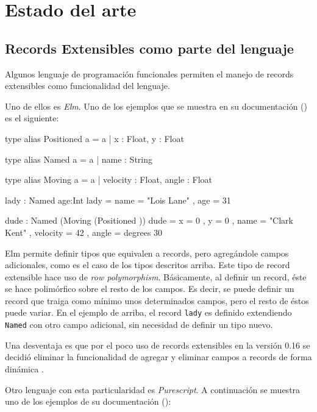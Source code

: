 
\chapter{Estado del arte}
\label{ch:2}


\section{Records Extensibles como parte del lenguaje}

Algunos lenguaje de programación funcionales permiten el manejo de records extensibles como funcionalidad del lenguaje.

Uno de ellos es \textit{Elm}. Uno de los ejemplos que se muestra en su documentación (\cite{ElmRecords}) es el siguiente:

\begin{code}
type alias Positioned a =
  { a | x : Float, y : Float }

type alias Named a =
  { a | name : String }

type alias Moving a =
  { a | velocity : Float, angle : Float }

lady : Named { age:Int }
lady =
  { name = "Lois Lane"
  , age = 31
  }

dude : Named (Moving (Positioned {}))
dude =
  { x = 0
  , y = 0
  , name = "Clark Kent"
  , velocity = 42
  , angle = degrees 30
  }
\end{code}

Elm permite definir tipos que equivalen a records, pero agregándole campos adicionales, como es el caso de los tipos descritos arriba. Este tipo de record extensible hace uso de \textit{row polymorphism}. Básicamente, al definir un record, éste se hace polimórfico sobre el resto de los campos. Es decir, se puede definir un record que traiga como mínimo unos determinados campos, pero el resto de éstos puede variar. En el ejemplo de arriba, el record \texttt{lady} es definido extendiendo \texttt{Named} con otro campo adicional, sin necesidad de definir un tipo nuevo. 

Una desventaja es que por el poco uso de records extensibles en la versión 0.16 se decidió eliminar la funcionalidad de agregar y eliminar campos a records de forma dinámica \cite{ElmReducedRecordSyntax}.

Otro lenguaje con esta particularidad es \textit{Purescript}. A continuación se muestra uno de los ejemplos de su documentación (\cite{PurescriptRecords}):

